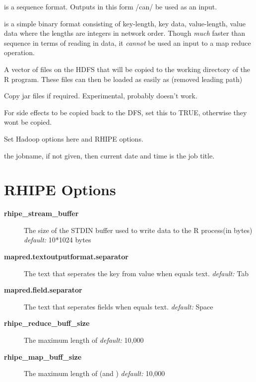 \documentclass[letterpaper,10pt,english]{manual}
\begin{document}
\begin{description}
\begin{description}
\begin{description}
\end{description}

\item[\code{sequence}]
is a sequence format. Outputs in this form /can/ be used as an input.

\item[\code{binary}]
is a simple binary format consisting of key-length, key data, value-length, value data where the lengths are integers in network order. Though \emph{much} faster than sequence in terms of reading in data, it \emph{cannot} be used an input to a map reduce operation.

\end{description}

\item[\code{shared}]
A vector of files on the HDFS that will be copied to the working directory of the R program. These files can then be loaded as easily as  (removed leading path)

\item[\code{jarfiles}]
Copy jar files if required. Experimental, probably doesn't work.

\item[\code{copyFiles}]
For side effects to be copied back to the DFS, set this to TRUE, otherwise they wont be copied.

\item[\code{mapred}]
Set Hadoop options here and RHIPE options.

\item[\code{jobname}]
the jobname, if not given, then current date and time is the job title.

\end{description}


\section{RHIPE Options}
\begin{description}
\item[\textbf{rhipe\_stream\_buffer}]
The size of the STDIN buffer used to write data to the R process(in bytes)
\emph{default:} 10*1024 bytes

\item[\textbf{mapred.textoutputformat.separator}]
The text that seperates the key from value when  equals text.
\emph{default:} Tab

\item[\textbf{mapred.field.separator}]
The text that seperates fields when  equals text.
\emph{default:} Space

\item[\textbf{rhipe\_reduce\_buff\_size}]
The maximum length of 
\emph{default:} 10,000

\item[\textbf{rhipe\_map\_buff\_size}]
The maximum length of  (and )
\emph{default:} 10,000

\end{description}
\end{document}

